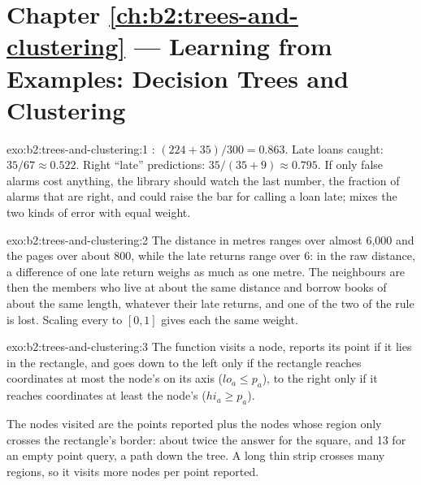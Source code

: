 \section*{Chapter \ref{ch:b2:trees-and-clustering} --- Learning from Examples: Decision Trees and Clustering}

\begin{solution}{exo:b2:trees-and-clustering:1}
: $(224 + 35)/300 = 0.863$. Late loans caught: $35/67 \approx 0.522$. Right ``late'' predictions: $35/(35 + 9)
\approx 0.795$. If only false alarms cost anything, the library should watch the last number, the fraction of alarms that
are right, and could raise the bar for calling a loan late;  mixes the two kinds of error with equal weight.
\end{solution}

\begin{solution}{exo:b2:trees-and-clustering:2}
The distance in metres ranges over almost 6,000 and the pages over about 800, while the late returns range over 6: in the
raw distance, a difference of one late return weighs as much as one metre. The neighbours are then the members who live
at about the same distance and borrow books of about the same length, whatever their late returns, and one of the two
 of the rule is lost. Scaling every  to $[0, 1]$ gives each the same weight.
\end{solution}

\begin{solution}{exo:b2:trees-and-clustering:3}
The function visits a node, reports its point if it lies in the rectangle, and goes down to the left only if the
rectangle reaches coordinates at most the node's on its axis ($\mathit{lo}_a \leq p_a$), to the right only if it reaches
coordinates at least the node's ($\mathit{hi}_a \geq p_a$).

The nodes visited are the points reported plus the nodes whose region only crosses the rectangle's border: about twice
the answer for the square, and 13 for an empty point query, a path down the tree. A long thin strip crosses many
regions, so it visits more nodes per point reported.
\end{solution}


